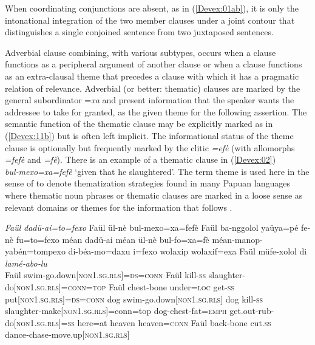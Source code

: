 \documentclass[output=paper]{LSP/langsci}
\begin{document}
\noindent
When coordinating conjunctions are absent, as in (\ref{Devex:01ab}), it is only the intonational integration of the two member clauses under a joint contour that distinguishes a single conjoined sentence from two juxtaposed sentences. 

Adverbial clause combining, with various subtypes, occurs when a clause functions as a peripheral argument of another clause or when a clause functions as an extra-clausal theme that precedes a clause with which it has a pragmatic relation of relevance. Adverbial (or better: thematic) clauses are marked by the general subordinator =\textit{xa} and present information that the speaker wants the addressee to take for granted, as the given theme for the following assertion. The semantic function of the thematic clause may be explicitly marked as in (\ref{Devex:11b}) but is often left implicit. The informational status of the theme clause is optionally but frequently marked by the  clitic \textit{=efè} (with allomorphs \textit{=fefè} and \textit{=fè}). There is an example of a thematic clause in (\ref{Devex:02}) \textit{bul‑mexo=xa=fefè} `given that he slaughtered'. The term theme is used here in the sense of \citet{Heeschen98} to denote thematization strategies found in many Papuan languages where thematic noun phrases or thematic clauses are marked in a loose sense as relevant domains or themes for the information that follows \citep[][814--816]{devries.2006}.


\begin{exe}
\ex \label{Devex:02}
\gll \textit{Faül} \textit{dadü-ai=to=fexo} Faül ül-nè bul-mexo=xa=fefè Faül ba-nggolol yaüya=pé fe-nè	fu=to=fexo méan dadü-ai méan ül-nè bul-fo=xa=fè méan-manop-yabén=tompexo di-béa-mo=daxu i=fexo wolaxip wolaxif=exa Faül müfe‑xolol di \textit{lamé‑abo‑lu}\\
Faül swim-go.down[\textsc{non1.sg.rls}]=\textsc{ds}=\textsc{conn} Faül kill-\textsc{ss} slaughter-do[\textsc{non1.sg.rls}]=\textsc{conn}=\textsc{top} Faül chest-bone under=\textsc{loc} get-\textsc{ss} put[\textsc{non1.sg.rls}]=\textsc{ds}=\textsc{conn} dog swim-go.down[\textsc{non1.sg.rls}] dog kill-\textsc{ss} slaughter‑make[\textsc{non1.sg.rls}]=conn=top dog-chest-fat=\textsc{emph} get.out-rub-do[\textsc{non1.sg.rls}]=\textsc{ss} here=at heaven heaven=\textsc{conn} Faül back‑bone cut.\textsc{ss} dance‑chase‑move.up[\textsc{non1.sg.rls}]\\
\glt {} \citep[][165]{enk97}\\
\end{exe}
\end{document}
